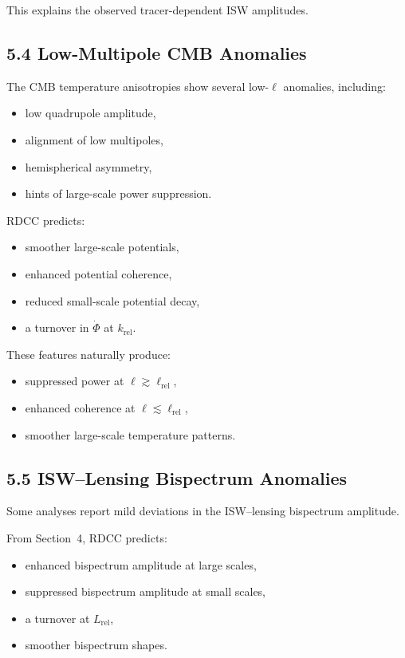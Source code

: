\documentclass[11pt,a4paper]{article}
\begin{document}
This explains the observed tracer-dependent ISW amplitudes.

\subsection*{5.4 Low-Multipole CMB Anomalies}

The CMB temperature anisotropies show several low-$\ell$ anomalies, including:

\begin{itemize}
    \item low quadrupole amplitude,
    \item alignment of low multipoles,
    \item hemispherical asymmetry,
    \item hints of large-scale power suppression.
\end{itemize}

RDCC predicts:

\begin{itemize}
    \item smoother large-scale potentials,
    \item enhanced potential coherence,
    \item reduced small-scale potential decay,
    \item a turnover in $\dot{\Phi}$ at $k_{\mathrm{rel}}$.
\end{itemize}

These features naturally produce:

\begin{itemize}
    \item suppressed power at $\ell \gtrsim \ell_{\mathrm{rel}}$,
    \item enhanced coherence at $\ell \lesssim \ell_{\mathrm{rel}}$,
    \item smoother large-scale temperature patterns.
\end{itemize}

\subsection*{5.5 ISW–Lensing Bispectrum Anomalies}

Some analyses report mild deviations in the ISW–lensing bispectrum amplitude.

From Section~4, RDCC predicts:

\begin{itemize}
    \item enhanced bispectrum amplitude at large scales,
    \item suppressed bispectrum amplitude at small scales,
    \item a turnover at $L_{\mathrm{rel}}$,
    \item smoother bispectrum shapes.
\end{itemize}
\end{document}
